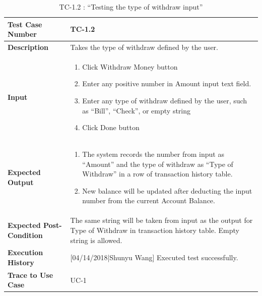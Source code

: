 \documentclass[12pt]{article}
\begin{document}
\begin{table}[H]
\caption{TC-1.2 : “Testing the type of withdraw input”}
\begin{center}
\begin{tabular}{|p{5.5	cm}|p{11cm}|}
\hline
\bf Test Case Number & 
TC-1.2 \\
\hline
\bf Description & 
Takes the type of withdraw defined by the user.\\
\hline
\bf Input & 
\begin{enumerate}
  \item Click Withdraw Money button
  \item Enter any positive number in Amount input text field.
  \item Enter any type of withdraw defined by the user, such as “Bill”, “Check”, or empty string
  \item Click Done button
\end{enumerate} \\
\hline
\bf Expected Output & 
\begin{enumerate}
  \item The system records the number from input as “Amount” and the type of withdraw as “Type of Withdraw” in a row of transaction history table.
  \item New balance will be updated after deducting the input number from the current Account Balance.
\end{enumerate} \\
\hline
\bf Expected Post-Condition & 
The same string will be taken from input as the output for Type of Withdraw in transaction history table. Empty string is allowed.\\
\hline
\bf Execution History & 
[04/14/2018|Shunyu Wang] Executed test successfully.\\
\hline
\bf Trace to Use Case & 
UC-1\\
\hline

\end{tabular}
\end{center}
\end{table}
\end{document}
